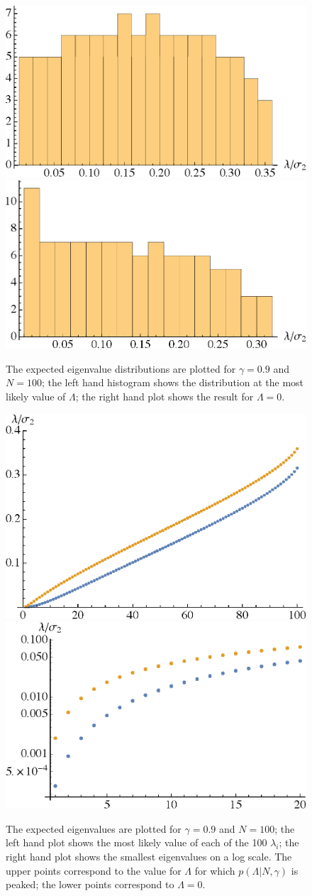 \documentclass[12pt]{article}
\begin{document}
\begin{figure} 
  \centering
  \includegraphics[width=.45\linewidth]{h1_100.eps} \hfill \includegraphics[width=.45\linewidth]{h2_100.eps}
  \caption{The expected eigenvalue distributions are plotted for $\gamma=0.9$ and $N=100$; the left hand histogram shows the distribution at the most likely value of $\Lambda$; the right hand plot shows the result for $\Lambda=0$.}
  \label{eigendist}
\end{figure}

\begin{figure} 
  \centering
  \includegraphics[width=.45\linewidth]{l1_100.eps} \hfill \includegraphics[width=.45\linewidth]{l2_100.eps}
  \caption{The expected eigenvalues are plotted for $\gamma=0.9$ and $N=100$; the left hand plot shows the most likely value of each of the 100 $\lambda_i$; the right hand plot shows the smallest eigenvalues on a log scale. The upper points correspond to the value for $\Lambda$ for which $p(\Lambda| N,\gamma)$  is peaked; the lower points correspond to $\Lambda=0$. }
  \label{eigendist}
\end{figure}
\end{document}
